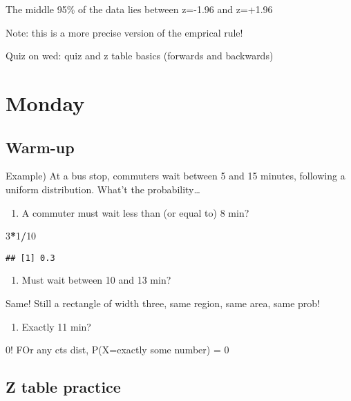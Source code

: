\documentclass[]{article}
\newenvironment{Shaded}{\begin{snugshade}}{\end{snugshade}}
\newcommand{\DecValTok}[1]{\textcolor[rgb]{0.00,0.00,0.81}{#1}}
\newcommand{\OperatorTok}[1]{\textcolor[rgb]{0.81,0.36,0.00}{\textbf{#1}}}
\providecommand{\tightlist}{%
  \setlength{\itemsep}{0pt}\setlength{\parskip}{0pt}}
\begin{document}
The middle 95\% of the data lies between z=-1.96 and z=+1.96

Note: this is a more precise version of the emprical rule!

Quiz on wed: quiz and z table basics (forwards and backwards)

\hypertarget{monday-1}{%
\section{Monday}\label{monday-1}}

\hypertarget{warm-up}{%
\subsection{Warm-up}\label{warm-up}}

Example) At a bus stop, commuters wait between 5 and 15 minutes,
following a uniform distribution. What't the probability\ldots{}

\begin{enumerate}
\def\labelenumi{\alph{enumi})}
\tightlist
\item
  A commuter must wait less than (or equal to) 8 min?
\end{enumerate}

\begin{Shaded}
\begin{Highlighting}[]
\DecValTok{3}\OperatorTok{*}\DecValTok{1}\OperatorTok{/}\DecValTok{10}
\end{Highlighting}
\end{Shaded}

\begin{verbatim}
## [1] 0.3
\end{verbatim}

\begin{enumerate}
\def\labelenumi{\alph{enumi})}
\setcounter{enumi}{1}
\tightlist
\item
  Must wait between 10 and 13 min?
\end{enumerate}

Same! Still a rectangle of width three, same region, same area, same
prob!

\begin{enumerate}
\def\labelenumi{\alph{enumi})}
\setcounter{enumi}{2}
\tightlist
\item
  Exactly 11 min?
\end{enumerate}

0! FOr any cts dist, P(X=exactly some number) = 0

\hypertarget{z-table-practice-1}{%
\subsection{Z table practice}\label{z-table-practice-1}}
\end{document}
